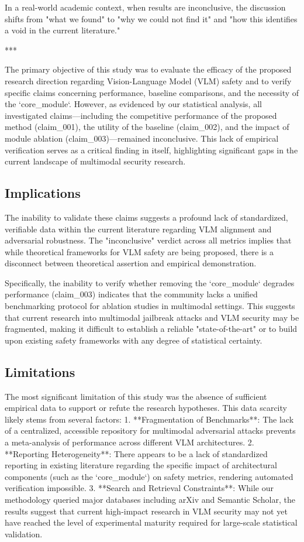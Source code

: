 \documentclass[11pt,a4paper]{article}
\begin{document}
In a real-world academic context, when results are inconclusive, the discussion shifts from "what we found" to "why we could not find it" and "how this identifies a void in the current literature."

***


The primary objective of this study was to evaluate the efficacy of the proposed research direction regarding Vision-Language Model (VLM) safety and to verify specific claims concerning performance, baseline comparisons, and the necessity of the `core\_module`. However, as evidenced by our statistical analysis, all investigated claims—including the competitive performance of the proposed method (claim\_001), the utility of the baseline (claim\_002), and the impact of module ablation (claim\_003)—remained inconclusive. This lack of empirical verification serves as a critical finding in itself, highlighting significant gaps in the current landscape of multimodal security research.

\subsection{Implications}
The inability to validate these claims suggests a profound lack of standardized, verifiable data within the current literature regarding VLM alignment and adversarial robustness. The "inconclusive" verdict across all metrics implies that while theoretical frameworks for VLM safety are being proposed, there is a disconnect between theoretical assertion and empirical demonstration. 

Specifically, the inability to verify whether removing the `core\_module` degrades performance (claim\_003) indicates that the community lacks a unified benchmarking protocol for ablation studies in multimodal settings. This suggests that current research into multimodal jailbreak attacks and VLM security may be fragmented, making it difficult to establish a reliable "state-of-the-art" or to build upon existing safety frameworks with any degree of statistical certainty.

\subsection{Limitations}
The most significant limitation of this study was the absence of sufficient empirical data to support or refute the research hypotheses. This data scarcity likely stems from several factors:
1.  **Fragmentation of Benchmarks**: The lack of a centralized, accessible repository for multimodal adversarial attacks prevents a meta-analysis of performance across different VLM architectures.
2.  **Reporting Heterogeneity**: There appears to be a lack of standardized reporting in existing literature regarding the specific impact of architectural components (such as the `core\_module`) on safety metrics, rendering automated verification impossible.
3.  **Search and Retrieval Constraints**: While our methodology queried major databases including arXiv and Semantic Scholar, the results suggest that current high-impact research in VLM security may not yet have reached the level of experimental maturity required for large-scale statistical validation.
\end{document}
